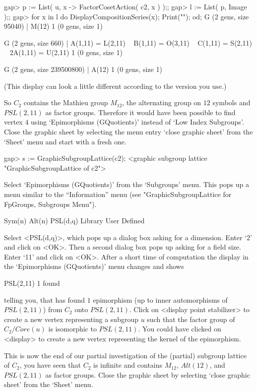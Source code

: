 \begintt
gap> p := List( u, x -> FactorCosetAction( c2, x ) );;
gap> l := List( p, Image );;
gap> for x  in l  do DisplayCompositionSeries(x);  Print("\n");  od;
G (2 gens, size 95040)
 | M(12)
1 (0 gens, size 1)

G (2 gens, size 660)
 | A(1,11) = L(2,11) ~ B(1,11) = O(3,11) ~ C(1,11) = S(2,11) ~ 2A(1,11) = U(2,11)
1 (0 gens, size 1)

G (2 gens, size 239500800)
 | A(12)
1 (0 gens, size 1)
\endtt

(This display can look a little different according to  the {\GAP} version you
use.)

So $C_2$ contains the Mathieu group $M_{12}$, the alternating group on
$12$  symbols and $PSL(2,11)$   as factor groups.   Therefore it would
have   been   possible  to   find   vertex  $4$   using  
`Epimorphisms (GQuotients)'  instead of  `Low Index Subgroups'.   
Close the graphic
sheet by selecting the menu entry `close graphic sheet' from the `Sheet'
menu and start with a fresh one.

\begintt
gap> s := GraphicSubgroupLattice(c2);
<graphic subgroup lattice "GraphicSubgroupLattice of c2">
\endtt

Select  `Epimorphisms (GQuotients)' from  the  `Subgroups' menu.  This
pops  up   a   menu   similar  to    the  ``Information''   menu    (see
"GraphicSubgroupLattice for FpGroups, Subgroups Menu").

\begintt
Sym(n)
Alt(n)
PSL(d,q)
Library
User Defined 
\endtt

Select <PSL(d,q)>, which pops up a dialog  box asking for a dimension. 
Enter `2' and click on <OK>. Then a second dialog box pops up asking
for a field size.  Enter `11' and click on  <OK>. After a short time
of  computation the display  in  the `Epimorphisms (GQuotients)'  menu
changes and shows

\begintt
PSL(2,11)      1 found
\endtt

telling you, that {\GAP} has found $1$ epimorphism (up to inner
automorphisms of $PSL(2,11)$) from $C_2$ onto $PSL(2,11)$.  Click on
<display point stabilizer> to create a new vertex representing a subgroup
$u$ such that the factor group of $C_2 / Core(u)$ is isomorphic to
$PSL(2,11)$. You could have clicked on <display> to create a new vertex
representing the kernel of the epimorphism.

This is  now the  end of  our  partial investigation of  the (partial)
subgroup lattice of  $C_2$, you have  seen that $C_2$ is infinite  and
contains $M_{12}$, $Alt(12)$, and $PSL(2,11)$ as factor groups.  Close
the  graphic sheet by selecting `close  graphic sheet'  from the `Sheet'
menu.


